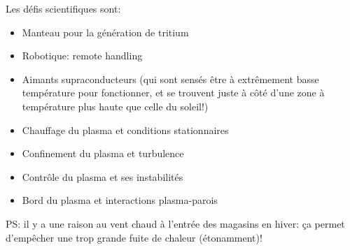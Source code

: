 \documentclass{article}
\begin{document}
 Les défis scientifiques sont:
\begin{itemize}
	\item Manteau pour la génération de tritium
	\item Robotique: remote handling
	\item Aimants supraconducteurs (qui sont sensés être à extrêmement basse température pour fonctionner, et se trouvent juste à côté d'une zone à température plus haute que celle du soleil!)
	\item Chauffage du plasma et conditions stationnaires
	\item Confinement du plasma et turbulence
	\item Contrôle du plasma et ses instabilités
	\item Bord du plasma et interactions plasma-parois
\end{itemize}
 
PS: il y a une raison au vent chaud à l'entrée des magasins en hiver: ça permet d'empêcher une trop grande fuite de chaleur (étonamment)!
\end{document}
